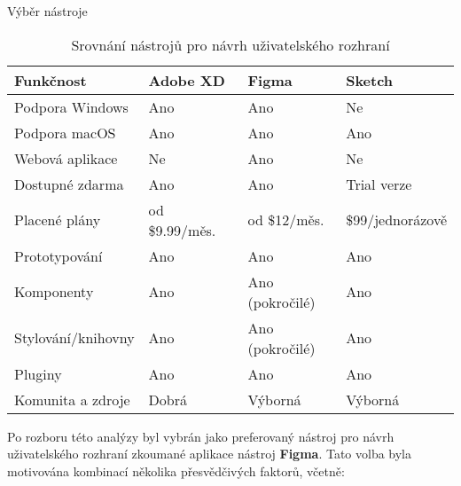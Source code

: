 \begin{subsection}{Výběr nástroje}
    \begin{table}[h]
        \centering
        \caption{Srovnání nástrojů pro návrh uživatelského rozhraní}
        \label{tab:ui-design-tools-comparison}
        \resizebox{\textwidth}{!}
        {
            \begin{tabular}{llll}
                \toprule
                \textbf{Funkčnost} & \textbf{Adobe XD} & \textbf{Figma}  & \textbf{Sketch}  \\
                \midrule
                Podpora Windows    & Ano               & Ano             & Ne               \\
                Podpora macOS      & Ano               & Ano             & Ano              \\
                Webová aplikace    & Ne                & Ano             & Ne               \\
                Dostupné zdarma    & Ano               & Ano             & Trial verze      \\
                Placené plány      & od \$9.99/měs.\    & od \$12/měs.\    & \$99/jednorázově \\
                Prototypování      & Ano               & Ano             & Ano              \\
                Komponenty         & Ano               & Ano (pokročilé) & Ano              \\
                Stylování/knihovny & Ano               & Ano (pokročilé) & Ano              \\
                Pluginy            & Ano               & Ano             & Ano              \\
                Komunita a zdroje  & Dobrá             & Výborná         & Výborná          \\
                \bottomrule
            \end{tabular}
        }
    \end{table}

    Po rozboru této analýzy byl vybrán jako preferovaný nástroj pro návrh uživatelského rozhraní zkoumané aplikace nástroj \textbf{Figma}.
    Tato volba byla motivována kombinací několika přesvědčivých faktorů, včetně:


\end{subsection}
